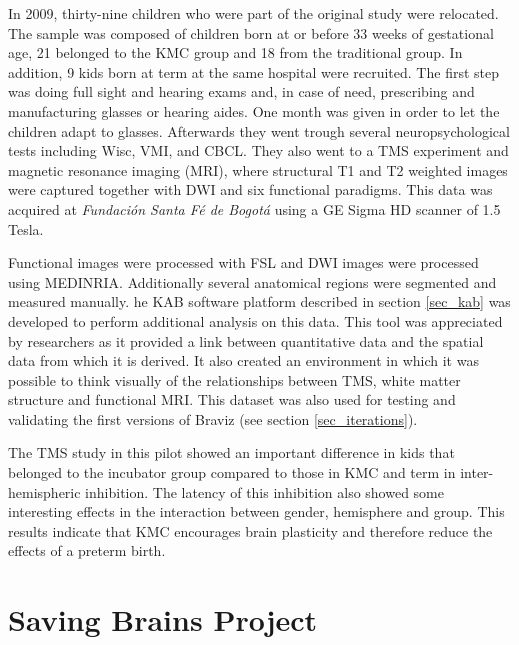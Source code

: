 In 2009, thirty-nine children who were part of the original study were relocated. The sample was composed of children born at or before 33 weeks of gestational age, 21 belonged to the KMC group and 18 from the traditional group. In addition, 9 kids born at term at the same hospital were recruited. 
The first step was doing full sight and hearing exams and, in case of need, prescribing and manufacturing glasses or hearing aides. One month was given in order to let the children adapt to glasses. Afterwards they went trough several neuropsychological tests including Wisc, VMI, and CBCL. They also went to a TMS experiment and magnetic resonance imaging (MRI), where structural T1 and T2 weighted images were captured together with DWI and six functional paradigms. This data was acquired at \emph{Fundación Santa Fé de Bogotá} using a GE Sigma HD scanner of 1.5 Tesla. 







Functional images were processed with FSL and DWI images were processed using MEDINRIA. Additionally several anatomical regions were segmented and measured manually. he KAB software platform described in section \ref{sec_kab} was developed to perform additional analysis on this data. This tool was appreciated by researchers as it provided a link between quantitative data and the spatial data from which it is derived. It also created an environment in which it was possible to think visually of the relationships between TMS, white matter structure and functional MRI. This dataset was also used for testing and validating the first versions of Braviz (see section \ref{sec_iterations}).

The TMS study in this pilot showed an important difference in kids that belonged to the incubator group compared to those in KMC and term \autocite{schneider_cerebral_2012} in inter-hemispheric inhibition. The latency of this inhibition also showed some interesting effects in the interaction between gender, hemisphere and group. This results indicate that KMC encourages brain plasticity and therefore reduce the effects of a preterm birth. 


\section{Saving Brains Project}

